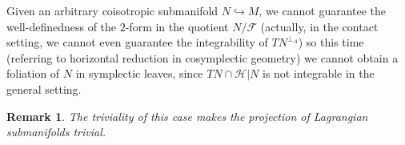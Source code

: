 \documentclass[12pt]{article}
\newtheorem{prop}{Proposition}[section]
\newtheorem{theorem}{Theorem}[section]
\newtheorem{remark}{Remark}[section]
\renewcommand{\ker}{\operatorname{Ker}}
\begin{document}


Given an arbitrary coisotropic submanifold $N \hookrightarrow M$, we cannot guarantee the well-definedness of the $2$-form in the quotient $N/\mathcal{F}$ (actually, in the contact setting, we cannot even guarantee the integrability of $TN^{\perp_\Lambda}$) so this time (referring to horizontal reduction in cosymplectic geometry) we cannot obtain a foliation of $N$ in symplectic leaves, since $TN \cap \mathcal{H}|N$ is not integrable in the general setting. \\

\begin{remark}{\rm The triviality of this case makes the projection of Lagrangian submanifolds trivial.}
\end{remark}


\end{document}
